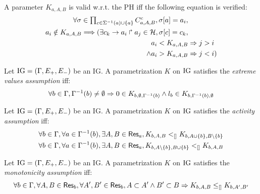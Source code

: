 
\begin{property}\label{pro:K-valid}
A parameter $K_{a,A,B}$ is valid w.r.t. the PH iff the following equation is verified:
\begin{align*}
\forall \sigma\in \textstyle\prod_{c\in\Sigma^{-1}(a) \cup \{a\}} C^c_{a,A,B},
	\sigma[a] = a_i,  & \\
		a_i \notin K_{a,A,B} \Longrightarrow (
  \exists c_k\rightarrow a_i\Rsh a_j\in\mathcal{H}, \sigma[c] = c_k, & \\
 \qquad a_i < K_{a,A,B} & \Rightarrow j > i  \\
 \qquad \wedge a_i > K_{a,A,B} & \Rightarrow j <i )
\end{align*}
\end{property}
		


\begin{property}
Let $\mathrm{IG} = (\Gamma, E_+, E_-)$ be an IG. A parametrization $K$ on $\mathrm{IG}$ satisfies the \emph{extreme values assumption} iff:
\label{prop:param_enum_extreme}
\[
  \forall b \in \Gamma, \Gamma^{-1}(b) \neq \emptyset \Rightarrow 0 \in K_{b,\emptyset,\Gamma^{-1}(b)} \wedge l_b \in K_{b,\Gamma^{-1}(b),\emptyset}
\]
\end{property}

\begin{property}
\label{prop:param_enum_activity}
Let $\mathrm{IG} = (\Gamma, E_+, E_-)$ be an IG. A parametrization $K$ on $\mathrm{IG}$ satisfies the \emph{activity assumption} iff:
\begin{align*}
  \forall b \in \Gamma, \forall a \in \Gamma^{-1}(b), \exists A,B \in \mathsf{Res}_{a}, K_{b,A,B} <_{[]} K_{b,A \cup \{b\},B \setminus \{b\}}
\\
  \forall b \in \Gamma, \forall a \in \Gamma^{-1}(b), \exists A,B \in \mathsf{Res}_{a}, K_{b,A \setminus \{b\},B \cup \{b\}} <_{[]} K_{b,A,B}
\end{align*}
\end{property}

\begin{property}
\label{prop:param_enum_monotonicity}
Let $\mathrm{IG} = (\Gamma, E_+, E_-)$ be an IG. A parametrization $K$ on $\mathrm{IG}$ satisfies the \emph{monotonicity assumption} iff:
\[
  \forall b \in \Gamma, \forall A,B \in \mathsf{Res}_{b}, \forall A',B' \in \mathsf{Res}_{b},
  A \subset A' \wedge B' \subset B \Rightarrow K_{b,A,B} \leq_{[]} K_{b,A',B'}
\]
\end{property}

